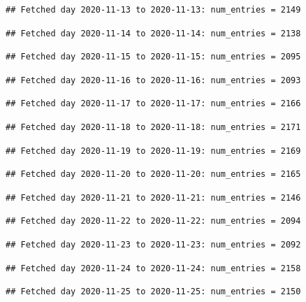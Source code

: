 \documentclass[]{article}
\begin{document}
\begin{verbatim}
## Fetched day 2020-11-13 to 2020-11-13: num_entries = 2149
\end{verbatim}

\begin{verbatim}
## Fetched day 2020-11-14 to 2020-11-14: num_entries = 2138
\end{verbatim}

\begin{verbatim}
## Fetched day 2020-11-15 to 2020-11-15: num_entries = 2095
\end{verbatim}

\begin{verbatim}
## Fetched day 2020-11-16 to 2020-11-16: num_entries = 2093
\end{verbatim}

\begin{verbatim}
## Fetched day 2020-11-17 to 2020-11-17: num_entries = 2166
\end{verbatim}

\begin{verbatim}
## Fetched day 2020-11-18 to 2020-11-18: num_entries = 2171
\end{verbatim}

\begin{verbatim}
## Fetched day 2020-11-19 to 2020-11-19: num_entries = 2169
\end{verbatim}

\begin{verbatim}
## Fetched day 2020-11-20 to 2020-11-20: num_entries = 2165
\end{verbatim}

\begin{verbatim}
## Fetched day 2020-11-21 to 2020-11-21: num_entries = 2146
\end{verbatim}

\begin{verbatim}
## Fetched day 2020-11-22 to 2020-11-22: num_entries = 2094
\end{verbatim}

\begin{verbatim}
## Fetched day 2020-11-23 to 2020-11-23: num_entries = 2092
\end{verbatim}

\begin{verbatim}
## Fetched day 2020-11-24 to 2020-11-24: num_entries = 2158
\end{verbatim}

\begin{verbatim}
## Fetched day 2020-11-25 to 2020-11-25: num_entries = 2150
\end{verbatim}
\end{document}
